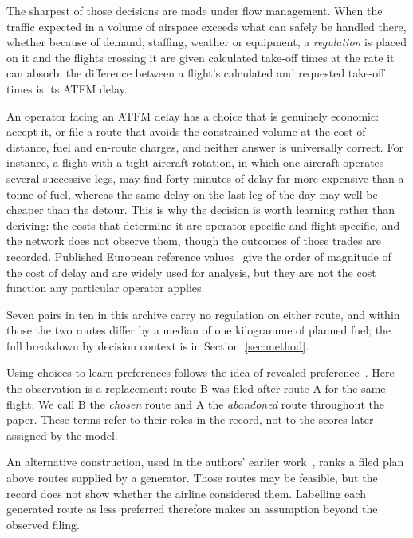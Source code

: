 \documentclass[a4paper,conference]{IEEEtran}
\begin{document}
The sharpest of those decisions are made under flow management. When the
traffic expected in a volume of airspace exceeds what can
safely be handled there, whether because of demand, staffing, weather or
equipment, a \emph{regulation} is placed on it and the flights crossing it are given calculated take-off times at
the rate it can absorb; the difference between a flight's calculated
and requested take-off times is its ATFM delay.

An
operator facing an ATFM delay has a choice that is genuinely
economic: accept it, or file a route that avoids the constrained
volume at the cost of distance, fuel and en-route charges, and neither
answer is universally correct. For instance, a flight with a tight
aircraft rotation, in which one aircraft operates several successive legs,
may find forty minutes of delay far more expensive than a
tonne of fuel, whereas the same delay on the last leg of the day may well be
cheaper than the detour. This is why the decision is worth learning rather
than deriving: the costs that determine it are operator-specific and
flight-specific, and the network does not observe them, though the
outcomes of those trades are recorded. Published European reference
values~\cite{cook2015} give the order of magnitude of the cost of delay
and are widely used for analysis, but they are not the cost function
any particular operator applies.

Seven pairs in ten in this archive carry no regulation on either route,
and within those the two routes differ by a median of one kilogramme of
planned fuel; the full breakdown by decision context is in
Section~\ref{sec:method}.


Using choices to learn preferences follows the idea of revealed
preference~\cite{samuelson1938}. Here the observation is a replacement:
route B was filed after route A for the same flight. We call B the
\emph{chosen} route and A the \emph{abandoned} route throughout the
paper. These terms refer to their roles in the record, not to the scores
later assigned by the model.

An alternative construction, used in the authors' earlier
work~\cite{dalmau2024}, ranks a filed plan above routes supplied by a
generator. Those routes may be feasible, but the record does not show
whether the airline considered them. Labelling each generated route as
less preferred therefore makes an assumption beyond the observed filing.
\end{document}
